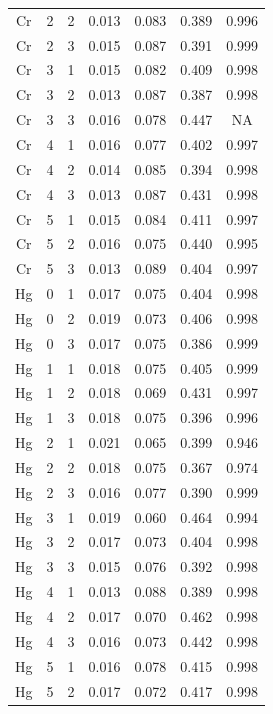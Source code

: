 \documentclass[ms, hidelinks]{uncgdissertationexp3}
\theoremstyle{plain}
\theoremstyle{definition}
\theoremstyle{remark}
\begin{document}
\begin{longtable}{ccccccc}
  Cr & 2 & 2 & 0.013 & 0.083 & 0.389 & 0.996\\
  \rowcolor{gray!6}  Cr & 2 & 3 & 0.015 & 0.087 & 0.391 & 0.999\\
  Cr & 3 & 1 & 0.015 & 0.082 & 0.409 & 0.998\\
  \rowcolor{gray!6}  Cr & 3 & 2 & 0.013 & 0.087 & 0.387 & 0.998\\
  Cr & 3 & 3 & 0.016 & 0.078 & 0.447 & NA\\
  \rowcolor{gray!6}  Cr & 4 & 1 & 0.016 & 0.077 & 0.402 & 0.997\\
  Cr & 4 & 2 & 0.014 & 0.085 & 0.394 & 0.998\\
  \rowcolor{gray!6}  Cr & 4 & 3 & 0.013 & 0.087 & 0.431 & 0.998\\
  Cr & 5 & 1 & 0.015 & 0.084 & 0.411 & 0.997\\
  \rowcolor{gray!6}  Cr & 5 & 2 & 0.016 & 0.075 & 0.440 & 0.995\\
  Cr & 5 & 3 & 0.013 & 0.089 & 0.404 & 0.997\\
  \rowcolor{gray!6}  Hg & 0 & 1 & 0.017 & 0.075 & 0.404 & 0.998\\
  Hg & 0 & 2 & 0.019 & 0.073 & 0.406 & 0.998\\
  \rowcolor{gray!6}  Hg & 0 & 3 & 0.017 & 0.075 & 0.386 & 0.999\\
  Hg & 1 & 1 & 0.018 & 0.075 & 0.405 & 0.999\\
  \rowcolor{gray!6}  Hg & 1 & 2 & 0.018 & 0.069 & 0.431 & 0.997\\
  Hg & 1 & 3 & 0.018 & 0.075 & 0.396 & 0.996\\
  \rowcolor{gray!6}  Hg & 2 & 1 & 0.021 & 0.065 & 0.399 & 0.946\\
  Hg & 2 & 2 & 0.018 & 0.075 & 0.367 & 0.974\\
  \rowcolor{gray!6}  Hg & 2 & 3 & 0.016 & 0.077 & 0.390 & 0.999\\
  Hg & 3 & 1 & 0.019 & 0.060 & 0.464 & 0.994\\
  \rowcolor{gray!6}  Hg & 3 & 2 & 0.017 & 0.073 & 0.404 & 0.998\\
  Hg & 3 & 3 & 0.015 & 0.076 & 0.392 & 0.998\\
  \rowcolor{gray!6}  Hg & 4 & 1 & 0.013 & 0.088 & 0.389 & 0.998\\
  Hg & 4 & 2 & 0.017 & 0.070 & 0.462 & 0.998\\
  \rowcolor{gray!6}  Hg & 4 & 3 & 0.016 & 0.073 & 0.442 & 0.998\\
  Hg & 5 & 1 & 0.016 & 0.078 & 0.415 & 0.998\\
  \rowcolor{gray!6}  Hg & 5 & 2 & 0.017 & 0.072 & 0.417 & 0.998\\

\end{longtable}
\end{document}
